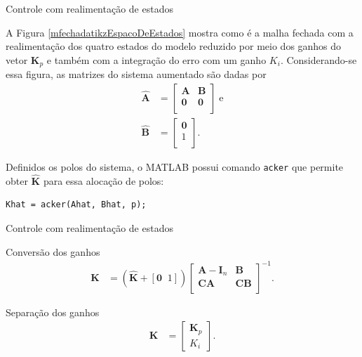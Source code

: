 \documentclass[10pt]{beamer}
\begin{document}
\begin{frame}[fragile]{Controle com realimentação de estados}
\begin{block}{}
A Figura \ref{mfechadatikzEspacoDeEstados} mostra como é a malha fechada com a realimentação dos quatro estados do modelo reduzido por meio dos ganhos do vetor $\mathbf{K}_p$ e também com a integração do erro com um ganho $K_i$. Considerando-se essa figura, as matrizes do sistema aumentado são dadas por \begin{align}
	\mathbf{\hat{A}} & = \left[\begin{array}{cc}
		\mathbf{A} & \mathbf{B}\\
		\mathbf{0} & \mathbf{0}\\
	\end{array}\right]\;\mathrm{e}\\
	\mathbf{\hat{B}} & = \left[\begin{array}{cc}
		\mathbf{0}\\
		1\\
	\end{array}\right].
\end{align}	
\end{block}

\begin{block}{}
Definidos os polos do sistema, o MATLAB possui comando \texttt{acker} que permite obter $\mathbf{\hat{K}}$ para essa alocação de polos:
\begin{lstlisting}
Khat = acker(Ahat, Bhat, p);
\end{lstlisting}	
\end{block}

\end{frame}

\begin{frame}[fragile]{Controle com realimentação de estados}
\begin{block}{Conversão dos ganhos}
\begin{align}
	\mathbf{K} &= \left(\mathbf{\hat{K}}+[\mathbf{0}\;\; 1]\right)\left[\begin{array}{cc}
	\mathbf{A}-\mathbf{I}_n & \mathbf{B}\\
	\mathbf{C}\mathbf{A} & \mathbf{C}\mathbf{B}\\
\end{array}
\right]^{-1}.\label{obterK}
\end{align}
\end{block}

\begin{block}{Separação dos ganhos}
	\begin{align}
	\mathbf{K} & = \left[\begin{array}{c}\mathbf{K}_p\\ K_i\end{array}\right].
\end{align}

\end{block}

\end{frame}
\end{document}
